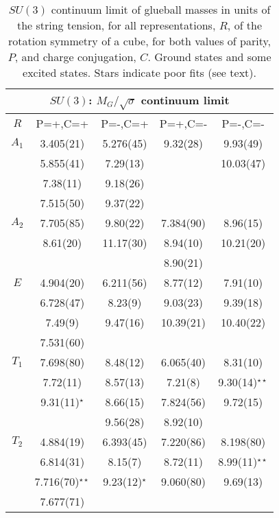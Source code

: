\documentclass[12pt]{article}
\begin{document}
\begin{table}[htb]
\centering
\begin{tabular}{|c|c|c|c|c|} \hline
\multicolumn{5}{|c|}{$SU(3)$: $M_G/\surd\sigma$  continuum limit} \\ \hline
  $R$   & P=+,C=+ & P=-,C=+ &  P=+,C=-   &  P=-,C=-   \\ \hline
$A_1$  & 3.405(21)  & 5.276(45) & 9.32(28)  &  9.93(49)  \\
    & 5.855(41)  & 7.29(13)  &           &  10.03(47) \\
    & 7.38(11)   & 9.18(26)  &           &           \\ 
    & 7.515(50)  & 9.37(22)  &           &            \\  \hline
$A_2$  & 7.705(85)  & 9.80(22)  & 7.384(90) &  8.96(15)  \\
    & 8.61(20)   & 11.17(30) & 8.94(10)  &  10.21(20) \\ 
    &            &           & 8.90(21)  &             \\  \hline
$E$   & 4.904(20)  & 6.211(56) & 8.77(12)  &  7.91(10)  \\
    & 6.728(47)  & 8.23(9)   & 9.03(23)  &  9.39(18)  \\ 
    & 7.49(9)    & 9.47(16)  & 10.39(21) &  10.40(22) \\ 
    & 7.531(60)  &           &           &            \\  \hline
$T_1$  & 7.698(80)  & 8.48(12)  & 6.065(40) &  8.31(10)  \\
    & 7.72(11)   & 8.57(13)  & 7.21(8)   &  9.30(14)$^{\star\star}$  \\ 
    & 9.31(11)$^\star$ & 8.66(15) & 7.824(56) & 9.72(15)  \\ 
    &            & 9.56(28)  & 8.92(10)  &            \\  \hline
$T_2$  & 4.884(19)  & 6.393(45) & 7.220(86) &  8.198(80) \\
    & 6.814(31)  & 8.15(7)   & 8.72(11)  &  8.99(11)$^{\star\star}$  \\ 
    & 7.716(70)$^{\star\star}$  & 9.23(12)$^\star$ & 9.060(80) &  9.69(13)  \\ 
    & 7.677(71)  &           &  &   \\  \hline
\end{tabular}
\caption{$SU(3)$ continuum limit of glueball masses in units of the string tension,
  for all representations, $R$, of the rotation symmetry of a cube, for
  both values of parity, $P$,
  and charge conjugation, $C$. Ground states and some excited states. Stars
  indicate poor fits (see text).}
\label{table_MK_R_SU3}
\end{table}
\end{document}
